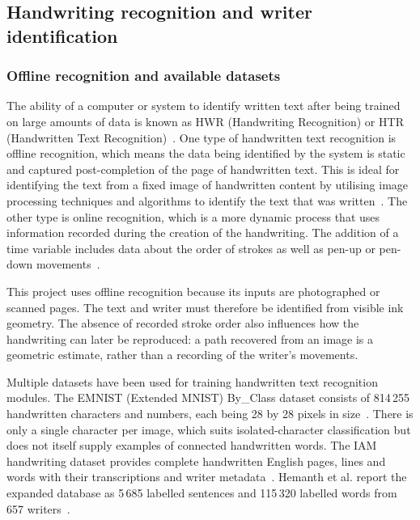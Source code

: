 \label{sec:literature}
\subsection{Handwriting recognition and writer identification}
\label{sec:lit-background}
\label{sec:lit-hwr}
\subsubsection{Offline recognition and available datasets}
The ability of a computer or system to identify written text after being trained on large amounts of data is known as HWR (Handwriting Recognition) or HTR (Handwritten Text Recognition)~\cite[p.~39]{chen2023}. One type of handwritten text recognition is offline recognition, which means the data being identified by the system is static and captured post-completion of the page of handwritten text. This is ideal for identifying the text from a fixed image of handwritten content by utilising image processing techniques and algorithms to identify the text that was written~\cite[p.~268]{ma2023}. The other type is online recognition, which is a more dynamic process that uses information recorded during the creation of the handwriting. The addition of a time variable includes data about the order of strokes as well as pen-up or pen-down movements~\cite[p.~18]{graves2013}.

This project uses offline recognition because its inputs are photographed or scanned pages. The text and writer must therefore be identified from visible ink geometry. The absence of recorded stroke order also influences how the handwriting can later be reproduced: a path recovered from an image is a geometric estimate, rather than a recording of the writer's movements.

Multiple datasets have been used for training handwritten text recognition modules. The EMNIST (Extended MNIST) By\_Class dataset consists of 814\,255 handwritten characters and numbers, each being 28 by 28 pixels in size~\cite[p.~40]{chen2023}. There is only a single character per image, which suits isolated-character classification but does not itself supply examples of connected handwritten words. The IAM handwriting dataset provides complete handwritten English pages, lines and words with their transcriptions and writer metadata~\cite{marti2002}. Hemanth et al. report the expanded database as 5\,685 labelled sentences and 115\,320 labelled words from 657 writers~\cite[p.~2460]{hemanth2022}.

